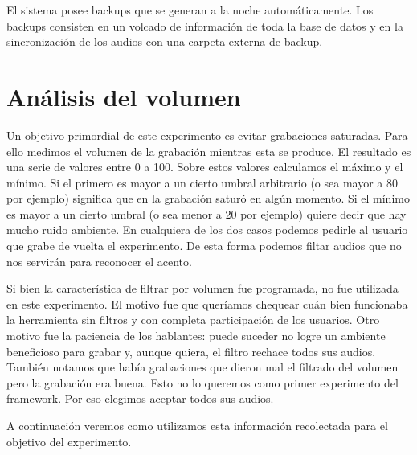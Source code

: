 El sistema posee backups que se generan a la noche automáticamente. Los backups consisten en un volcado de información de toda la base de datos y en la sincronización de los audios con una carpeta externa de backup.

\section{Análisis del volumen}

Un objetivo primordial de este experimento es evitar grabaciones saturadas. Para ello medimos el volumen de la grabación mientras esta se produce. El resultado es una serie de valores entre 0 a 100. Sobre estos valores calculamos el máximo y el mínimo. Si el primero es mayor a un cierto umbral arbitrario (o sea mayor a 80 por ejemplo) significa que en la grabación saturó en algún momento. Si el mínimo es mayor a un cierto umbral (o sea menor a 20 por ejemplo) quiere decir que hay mucho ruido ambiente. En cualquiera de los dos casos podemos pedirle al usuario que grabe de vuelta el experimento. De esta forma podemos filtar audios que no nos servirán para reconocer el acento.

Si bien la característica de filtrar por volumen fue programada, no fue utilizada en este experimento. El motivo fue que queríamos chequear cuán bien funcionaba la herramienta sin filtros y con completa participación de los usuarios. Otro motivo fue la paciencia de los hablantes: puede suceder no logre un ambiente beneficioso para grabar y, aunque quiera, el filtro rechace todos sus audios. También notamos que había grabaciones que dieron mal el filtrado del volumen pero la grabación era buena. Esto no lo queremos como primer experimento del framework. Por eso elegimos aceptar todos sus audios.

A continuación veremos como utilizamos esta información recolectada para el objetivo del experimento.